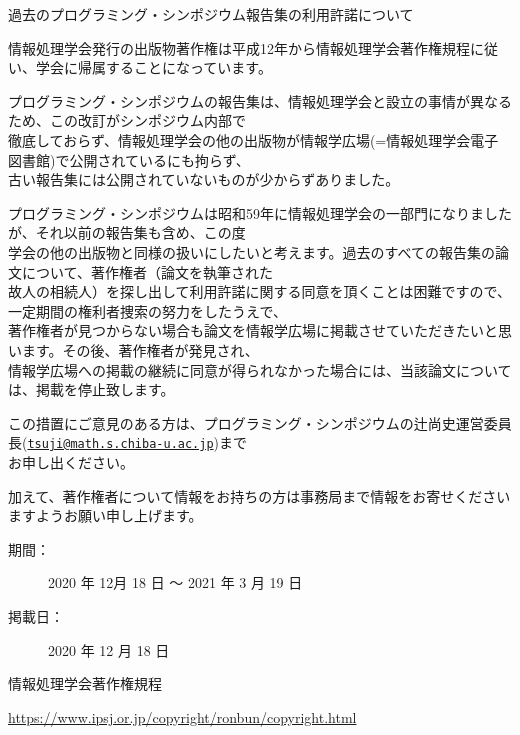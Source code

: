 \documentclass[b5j]{jsarticle}
\begin{document}
\begin{itembox}[l]{過去のプログラミング・シンポジウム報告集の利用許諾について}

\footnotesize

情報処理学会発行の出版物著作権は平成12年から情報処理学会著作権規程に従い、学会に帰属することになっています。

\medskip

プログラミング・シンポジウムの報告集は、情報処理学会と設立の事情が異なるため、この改訂がシンポジウム内部で\\徹底しておらず、情報処理学会の他の出版物が情報学広場(=情報処理学会電子図書館)で公開されているにも拘らず、\\古い報告集には公開されていないものが少からずありました。

\medskip

プログラミング・シンポジウムは昭和59年に情報処理学会の一部門になりましたが、それ以前の報告集も含め、この度\\学会の他の出版物と同様の扱いにしたいと考えます。過去のすべての報告集の論文について、著作権者（論文を執筆された\\故人の相続人）を探し出して利用許諾に関する同意を頂くことは困難ですので、一定期間の権利者捜索の努力をしたうえで、\\著作権者が見つからない場合も論文を情報学広場に掲載させていただきたいと思います。その後、著作権者が発見され、\\情報学広場への掲載の継続に同意が得られなかった場合には、当該論文については、掲載を停止致します。

\medskip

この措置にご意見のある方は、プログラミング・シンポジウムの辻尚史運営委員長(\href{mailto:tsuji@math.s.chiba-u.ac.jp}{\nolinkurl{tsuji@math.s.chiba-u.ac.jp}})まで\\お申し出ください。

\medskip

加えて、著作権者について情報をお持ちの方は事務局まで情報をお寄せくださいますようお願い申し上げます。

\medskip

\begin{description}
\item[期間：] 2020 年 12月 18 日 ～ 2021 年 3 月 19 日
\item[掲載日：] 2020 年 12 月 18 日
\end{description}

\medskip


\medskip

情報処理学会著作権規程

\url{https://www.ipsj.or.jp/copyright/ronbun/copyright.html}

\medskip

\end{itembox}
\end{document}

